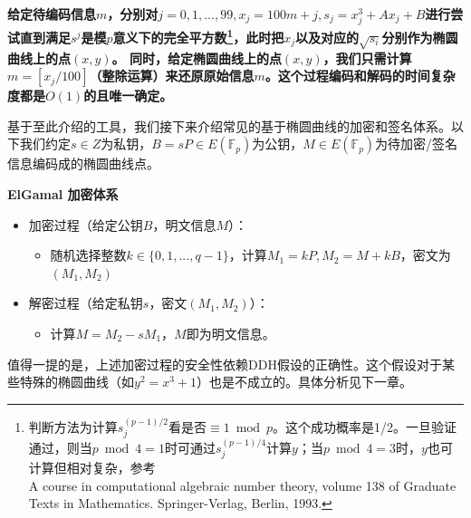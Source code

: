 \documentclass[12pt]{article}
\newcommand{\ec}{椭圆曲线}
\newcommand{\fp}{\mathbb{F}_p}
\begin{document}
\textbf{
给定待编码信息$m$，分别对$j=0,1,...,99, x_j = 100m+j, s_j = x_j^3+Ax_j+B$进行尝试直到满足$s^j$是模$p$意义下的完全平方数\footnote{判断方法为计算$s_j^{(p-1)/2}$看是否$\equiv 1 \bmod p$。这个成功概率是1/2。一旦验证通过，则当$p \bmod 4 =1 $时可通过$s_j^{(p-1)/4}$计算$y$；当$p \bmod 4 = 3$时，$y$也可计算但相对复杂，参考\\A course in computational algebraic number theory, volume 138 of Graduate Texts in Mathematics. Springer-Verlag, Berlin, 1993.}，此时把$x_j$以及对应的$\sqrt{s_i}$分别作为\ec 上的点$(x,y)$。
同时，给定椭圆曲线上的点$(x,y)$，我们只需计算$m=[x_j/100]$（整除运算）来还原原始信息$m$。这个过程编码和解码的时间复杂度都是$O(1)$的且唯一确定。}

基于至此介绍的工具，我们接下来介绍常见的基于\ec 的加密和签名体系。以下我们约定$s \in Z$为私钥，$B=sP \in E(\fp)$为公钥，$M \in E(\fp)$为待加密/签名信息编码成的\ec 点。

\textbf{ElGamal 加密体系}
\begin{itemize}
	\item 加密过程（给定公钥$B$，明文信息$M$）：
	\begin{itemize}
		\item 随机选择整数$k \in \{0,1,...,q-1\}$，计算$M_1 = kP, M_2 = M+kB$，密文为$(M_1,M_2)$
	\end{itemize}
	\item 解密过程（给定私钥$s$，密文$(M_1,M_2)$）：
   \begin{itemize}
   	    \item 计算$M=M_2-sM_1$，$M$即为明文信息。
   \end{itemize} 
\end{itemize}
值得一提的是，上述加密过程的安全性依赖DDH假设的正确性。这个假设对于某些特殊的椭圆曲线（如$y^2= x^3+1$）也是不成立的。具体分析见下一章。
\end{document}
